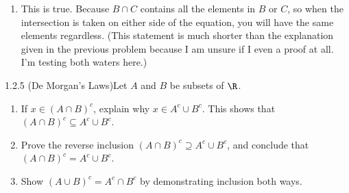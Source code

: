 {\begin{enumerate}
\begin{enumerate}[label=(\arabic*)]
                        \begin{enumerate}[label=\roman*.]
                            \item \textbf{If the set inside the parenthesis is not empty}, then we have \(y\) and \(z \in B \cap C\). Then it could be the case that \(y\) and \(z \in A\). From this, we know 2 things can occur. Either every set contains only \(y\), or \(y\) and \(z\).
                            \item \textbf{If the set inside the parenthesis is empty}, then the resulting intersection with \(A\) would be the empty set.
                        \end{enumerate}
                  \item In every case, either we get the empty set, or end up in a situation where every set contains just \(y\) or all elements. Hence, the two sides of the equation will always equal each other.
              \end{enumerate}
        \item This is true. Because \(B \cap C\) contains all the elements in \(B\) or \(C\), so when the intersection is taken on either side of the equation, you will have the same elements regardless. (This statement is much shorter than the explanation given in the previous problem because I am unsure if I even a proof at all. I'm testing both waters here.)
    \end{enumerate}
}

\newpage
\begin{exercise}
    {1.2.5 (De Morgan's Laws)}Let \(A\) and \(B\) be subsets of \(\R\).
    \begin{enumerate}
        \item  If \(x \in (A \cap B)^c\), explain why \(x \in A^c \cup B^c\). This shows that \((A \cap B)^c \subseteq A^c \cup B^c\).
        \item Prove the reverse inclusion \((A \cap B)^c \supseteq A^c \cup B^c\), and conclude that \((A \cap B)^c = A^c \cup B^c\).
        \item Show \((A \cup B)^c = A^c \cap B^c\) by demonstrating inclusion both ways.
    \end{enumerate}
\end{exercise}

